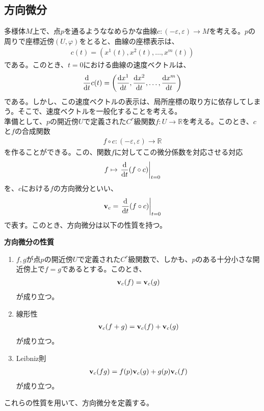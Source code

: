 \documentclass[a4paper,11pt]{jsarticle}
\numberwithin{equation}{section}
\begin{document}
\subsection{方向微分}
多様体$M$上で、点$p$を通るようななめらかな曲線$c: (-\varepsilon, \varepsilon) \to M$を考える。$p$の周りで座標近傍$(U, \varphi)$をとると、曲線の座標表示は、
\begin{align}
  c(t) = (x^1(t), x^2(t), \ldots, x^m(t))
\end{align}
である。このとき、$t=0$における曲線の速度ベクトルは、
\begin{align}
  \dv{t} c(t) = \qty(\dv{x^1}{t}, \dv{x^2}{t}, \ldots, \dv{x^m}{t})
\end{align}
である。しかし、この速度ベクトルの表示は、局所座標の取り方に依存してしまう。そこで、速度ベクトルを一般化することを考える。\\
準備として、$p$の開近傍$U$で定義された$C^r$級関数$f: U \to \mathbb{R}$を考える。このとき、$c$と$f$の合成関数
\begin{align}
  f \circ c: (-\varepsilon, \varepsilon) \to \mathbb{R}
\end{align}
を作ることができる。この、関数$f$に対してこの微分係数を対応させる対応
\begin{align}
  f \mapsto \left.\dv{t} (f \circ c)\right|_{t=0} 
\end{align}
を、$c$における$f$の方向微分といい、
\begin{align}
  \vb{v}_c = \left.\dv{t} (f \circ c)\right|_{t=0}
\end{align}
で表す。このとき、方向微分は以下の性質を持つ。\\
\begin{itembox}[l]{\textbf{方向微分の性質}}
  \begin{enumerate}
    \item $f,g$が点$p$の開近傍$U$で定義された$C^r$級関数で、しかも、$p$のある十分小さな開近傍上で$f=g$であるとする。このとき、
    \begin{align}
      \vb{v}_c(f) = \vb{v}_c(g)
    \end{align}
    が成り立つ。
    \item 線形性
    \begin{align}
      \vb{v}_c(f + g) = \vb{v}_c(f) + \vb{v}_c(g)
    \end{align}
    が成り立つ。
    \item Leibniz則
    \begin{align}
      \vb{v}_c(fg) = f(p) \vb{v}_c(g) + g(p) \vb{v}_c(f)
    \end{align}
    が成り立つ。
  \end{enumerate}
\end{itembox}
これらの性質を用いて、方向微分を定義する。\\
\end{document}
